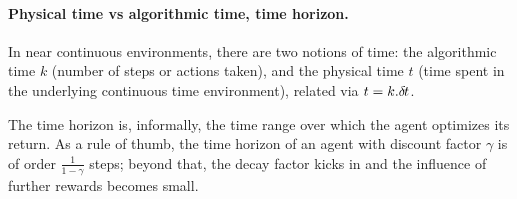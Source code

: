 


      \paragraph{Physical time vs algorithmic time, time horizon.}
        In near continuous environments, there are two notions of time:
the algorithmic time $k$ (number of steps or actions taken), and the
physical time $t$ (time spent
in the underlying continuous time environment), related via
$t=k.{\delta\hspace{-.1em}t}$.

The time horizon is, informally, the time range over
which the agent optimizes its return.
As a rule of thumb,
the time horizon of an agent with discount factor $\gamma$ is
of order $\frac{1}{1 - \gamma}$ steps; beyond that, the decay factor
kicks in and the influence of further rewards becomes small.

